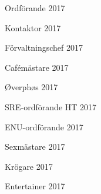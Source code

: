 \documentclass[../_main/handlingar.tex]{subfiles}
\begin{document}
\newpage
\begin{signatures}{10}
    \mvh
    \signature{Erik Månsson}{Ordförande 2017}
    \signature{Johan Karlberg}{Kontaktor 2017}
    \signature{Sophia Grimmeiss Grahm}{Förvaltningschef 2017}
    \signature{Daniel Bakic}{Cafémästare 2017}
    \signature{Niklas Gustafson}{Øverphøs 2017}
    \signature{Edvard Carlsson}{SRE-ordförande HT 2017}
    \signature{Josefine Sandström}{ENU-ordförande 2017}
    \signature{Linnea Sjödahl}{Sexmästare 2017}
    \signature{Markus Rahne}{Krögare 2017}
    \signature{Albin Nyström Eklund}{Entertainer 2017}
\end{signatures}
\end{document}
